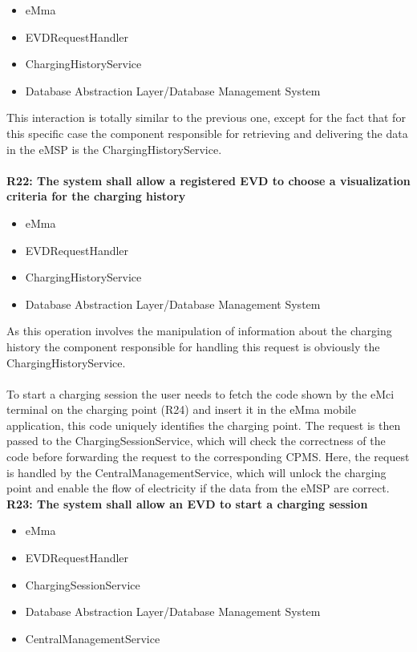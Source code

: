 \begin{itemize}
	\item eMma
	\item EVDRequestHandler
	\item ChargingHistoryService
	\item Database Abstraction Layer/Database Management System
\end{itemize}
This interaction is totally similar to the previous one, except for the fact that for this specific case the component responsible for retrieving and delivering the data in the eMSP is the ChargingHistoryService.\\
\\
\textbf{R22: The system shall allow a registered EVD to choose a visualization criteria for the charging history}
\begin{itemize}
	\item eMma
	\item EVDRequestHandler
	\item ChargingHistoryService
    \item Database Abstraction Layer/Database Management System
\end{itemize}
As this operation involves the manipulation of information about the charging history the component responsible for handling this request is obviously the ChargingHistoryService.\\
\\
To start a charging session the user needs to fetch the code shown by the eMci terminal on the charging point (R24) and insert it in the eMma mobile application, this code uniquely identifies the charging point. The request is then passed to the ChargingSessionService, which will check the correctness of the code before forwarding the request to the corresponding CPMS. Here, the request is handled by the CentralManagementService, which will unlock the charging point and enable the flow of electricity if the data from the eMSP are correct.\\

\textbf{R23: The system shall allow an EVD to start a charging session}
\begin{itemize}
	\item eMma
	\item EVDRequestHandler
	\item ChargingSessionService
    \item Database Abstraction Layer/Database Management System
	\item CentralManagementService
\end{itemize}

